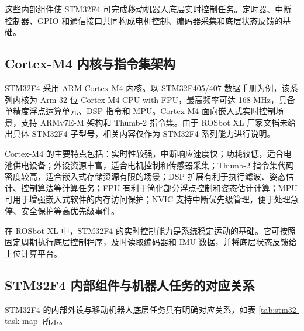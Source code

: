 \documentclass[UTF8,a4paper,12pt]{ctexrep}
\begin{document}
这些内部组件使 STM32F4 可完成移动机器人底层实时控制任务。定时器、中断控制器、GPIO 和通信接口共同构成电机控制、编码器采集和底层状态反馈的基础。

\subsection{Cortex-M4 内核与指令集架构}

STM32F4 采用 ARM Cortex-M4 内核。以 STM32F405/407 数据手册为例，该系列内核为 Arm 32 位 Cortex-M4 CPU with FPU，最高频率可达 168 MHz，具备单精度浮点运算单元、DSP 指令和 MPU。Cortex-M4 面向嵌入式实时控制场景，支持 ARMv7E-M 架构和 Thumb-2 指令集。由于 ROSbot XL 厂家文档未给出具体 STM32F4 子型号，相关内容仅作为 STM32F4 系列能力进行说明。

Cortex-M4 的主要特点包括：实时性较强，中断响应速度快；功耗较低，适合电池供电设备；外设资源丰富，适合电机控制和传感器采集；Thumb-2 指令集代码密度较高，适合嵌入式存储资源有限的场景；DSP 扩展有利于执行滤波、姿态估计、控制算法等计算任务；FPU 有利于简化部分浮点控制和姿态估计计算；MPU 可用于增强嵌入式软件的内存访问保护；NVIC 支持中断优先级管理，便于处理急停、安全保护等高优先级事件。

在 ROSbot XL 中，STM32F4 的实时控制能力是系统稳定运动的基础。它可按照固定周期执行底层控制程序，及时读取编码器和 IMU 数据，并将底层状态反馈给上位计算平台。

\subsection{STM32F4 内部组件与机器人任务的对应关系}

STM32F4 的内部外设与移动机器人底层任务具有明确对应关系，如表 \ref{tab:stm32-task-map} 所示。
\end{document}
